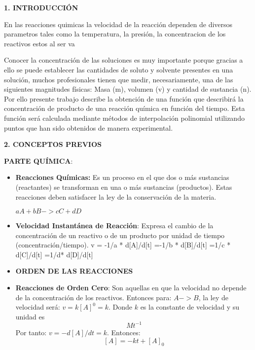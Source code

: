 \documentclass[10pt,a4paper]{article}
\begin{document}
\begin{multicols}{2}
\begin{center}
{\large \bf 1. INTRODUCCI\'ON}
\end{center}

En las reacciones quimicas la velocidad de la reacción dependen de diversos parametros tales como la temperatura, la presión, la concentracion de los reactivos estos al ser va


Conocer la concentración de las soluciones es muy importante porque gracias a ello se puede establecer las cantidades de soluto y solvente presentes en una solución, muchos profesionales tienen que medir, necesariamente, una de las siguientes magnitudes físicas: Masa (m), volumen (v) y cantidad de sustancia (n). \\
 
Por ello presente trabajo describe la obtención de una función que describirá la concentración de producto de una reacción química en función del tiempo. Esta función será calculada mediante métodos de interpolación polinomial utilizando puntos que han sido obtenidos de manera experimental.

\begin{center}
{\large \bf 2. CONCEPTOS PREVIOS}
\end{center}
\noindent \textbf{PARTE QUÍMICA}:

\begin{itemize}

	\item \textbf{Reacciones Químicas:} Es un proceso en el que dos o más sustancias (reactantes) se transforman en una o más sustancias (productos). Estas reacciones deben satisfacer la ley de la conservación de la materia.
    \begin{center}
		$aA  +  bB  ->  cC  +  dD$
    \end{center}
	\item \textbf{Velocidad Instantánea de Reacción}: Expresa el cambio de la concentración de un reactivo o de un producto por unidad de tiempo (concentración/tiempo).
	{\scriptsize
	         v = -1/a * d[A]/d[t] =-1/b * d[B]/d[t] =1/c * d[C]/d[t] =1/d* d[D]/d[t] 
	}

	\item \textbf{ORDEN DE LAS REACCIONES}
	\item \textbf{Reacciones de Orden Cero}: Son aquellas en que la velocidad no depende de la concentración de los reactivos. Entonces para: $A -> B$, la ley de velocidad será: $v=k[A]^0=k$. Donde $k$ es la constante de velocidad y su unidad es \[Mt^{-1}\] Por tanto:
	$v=-d[A]/dt=k$.
	Entonces:  \[[A]=-kt+[A]_0\]


\end{itemize}
\end{multicols}
\end{document}
